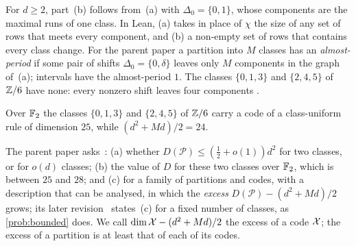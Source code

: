 For $d\ge2$, part~(b) follows from~(a) with $\Delta_0=\{0,1\}$, whose components are the maximal runs of one class.
In Lean, (a) takes in place of $\chi$ the size of any set of rows that meets every component, and (b) a non-empty set of
rows that contains every class change. For the parent paper a
partition into $M$ classes has an \emph{almost-period} if some pair of shifts $\Delta_0=\{0,\delta\}$ leaves only $M$
components in the graph of~(a); intervals have the almost-period $1$. The classes $\{0,1,3\}$ and
$\{2,4,5\}$ of $\mathbb{Z}/6$ have none: every nonzero shift leaves four components
\cite[Remark~8.1(c)]{SeventeenthPaper2026}.

\begin{proposition}\label{prop:F2}
Over $\mathbb{F}_2$ the classes $\{0,1,3\}$ and $\{2,4,5\}$ of $\mathbb{Z}/6$ carry a code of a class-uniform rule of dimension $25$,
while $(d^2+Md)/2=24$.
\end{proposition}

The parent paper asks~\cite[Problem~9.1]{SeventeenthPaper2026}: (a) whether $D(\mathcal P)\le(\frac12+o(1))d^2$ for two
classes, or for $o(d)$ classes; (b) the value of $D$ for these two classes over $\mathbb{F}_2$, which is between $25$ and $28$;
and (c) for a family of partitions and codes, with a description that can be analysed, in which the \emph{excess}
$D(\mathcal P)-(d^2+Md)/2$ grows; its later revision~\cite{SeventeenthPaperRevised2026} states~(c) for a fixed
number of classes, as \cref{prob:bounded} does. We call $\dim\mathcal{X}-(d^2+Md)/2$ the excess of a code $\mathcal{X}$; the excess of a partition is at
least that of each of its codes.
